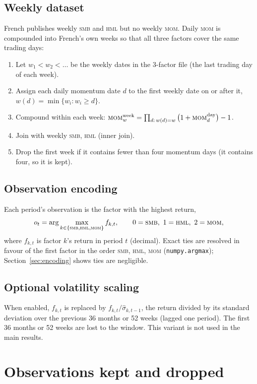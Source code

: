 \documentclass[11pt]{article}
\newcommand{\SMB}{\textsc{smb}}
\newcommand{\HML}{\textsc{hml}}
\newcommand{\MOM}{\textsc{mom}}
\begin{document}
\subsection{Weekly dataset}
French publishes weekly \SMB{} and \HML{} but no weekly \MOM. Daily \MOM{} is compounded into French's own weeks so that all three factors cover the same trading days:
\begin{enumerate}
\item Let $w_1<w_2<\dots$ be the weekly dates in the 3-factor file (the last trading day of each week).
\item Assign each daily momentum date $d$ to the first weekly date on or after it, $w(d)=\min\{w_i: w_i\ge d\}$.
\item Compound within each week: $\MOM^{\text{week}}_{w}=\prod_{d:\,w(d)=w}\big(1+\MOM^{\text{day}}_d\big)-1$.
\item Join with weekly \SMB, \HML{} (inner join).
\item Drop the first week if it contains fewer than four momentum days (it contains four, so it is kept).
\end{enumerate}

\subsection{Observation encoding}
Each period's observation is the factor with the highest return,
\[
o_t=\arg\max_{k\in\{\SMB,\HML,\MOM\}} f_{k,t},\qquad 0=\SMB,\ 1=\HML,\ 2=\MOM,
\]
where $f_{k,t}$ is factor $k$'s return in period $t$ (decimal). Exact ties are resolved in favour of the first factor in the order \SMB, \HML, \MOM{} (\texttt{numpy.argmax}); Section~\ref{sec:encoding} shows ties are negligible.

\subsection{Optional volatility scaling}
When enabled, $f_{k,t}$ is replaced by $f_{k,t}/\hat\sigma_{k,t-1}$, the return divided by its standard deviation over the previous 36 months or 52 weeks (lagged one period). The first 36 months or 52 weeks are lost to the window. This variant is not used in the main results.

\section{Observations kept and dropped}
\end{document}
